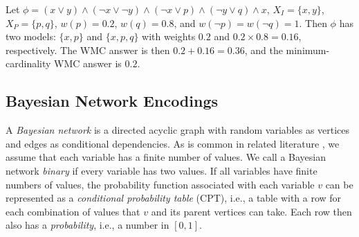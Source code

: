 \begin{example}\label{example:1}
  Let
  $\phi = (x \lor y) \land (\neg x \lor \neg y) \land (\neg x \lor p) \land (\neg y \lor q) \land x$,
  $X_I = \{ x, y \}$, $X_P = \{ p, q \}$, $w(p) = 0.2$, $w(q) = 0.8$, and
  $w(\neg p) = w(\neg q) = 1$. Then $\phi$ has two models: $\{x, p\}$ and
  $\{ x, p, q \}$ with weights $0.2$ and $0.2 \times 0.8 = 0.16$, respectively.
  The WMC answer is then $0.2 + 0.16 = 0.36$, and the minimum-cardinality WMC
  answer is $0.2$.
\end{example}

\subsection{Bayesian Network Encodings}\label{sec:encodings}

A \emph{Bayesian network} is a directed acyclic graph with random variables as
vertices and edges as conditional dependencies. As is common in related
literature \citep{DBLP:conf/kr/Darwiche02,DBLP:conf/aaai/SangBK05}, we assume
that each variable has a finite number of values. We call a Bayesian network
\emph{binary} if every variable has two values. If all variables have finite
numbers of values, the probability function associated with each variable $v$
can be represented as a \emph{conditional probability table} (CPT), i.e., a
table with a row for each combination of values that $v$ and its parent vertices
can take. Each row then also has a \emph{probability}, i.e., a number in
$[0, 1]$.

